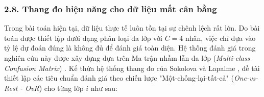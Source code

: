 \subsubsection{2.8. Thang đo hiệu năng cho dữ liệu mất cân bằng}
\label{sec:metrics}

\indent\indent Trong bài toán hiện tại, dữ liệu thực tế luôn tồn tại sự chênh lệch rất lớn. Do bài toán được thiết lập dưới dạng phân loại đa lớp với $C=4$ nhãn, việc chỉ dựa vào tỷ lệ dự đoán đúng là không đủ để đánh giá toàn diện. Hệ thống đánh giá trong nghiên cứu này được xây dựng dựa trên Ma trận nhầm lẫn đa lớp (\textit{Multi-class Confusion Matrix}) \cite{fawcett2006introduction}. Kế thừa hệ thống thang đo của Sokolova và Lapalme \cite{sokolova2009systematic}, đề tài thiết lập các tiêu chuẩn đánh giá theo chiến lược "Một-chống-lại-tất-cả" (\textit{One-vs-Rest - OvR}) cho từng lớp $i$ như sau:\vspace{-0.1cm}

